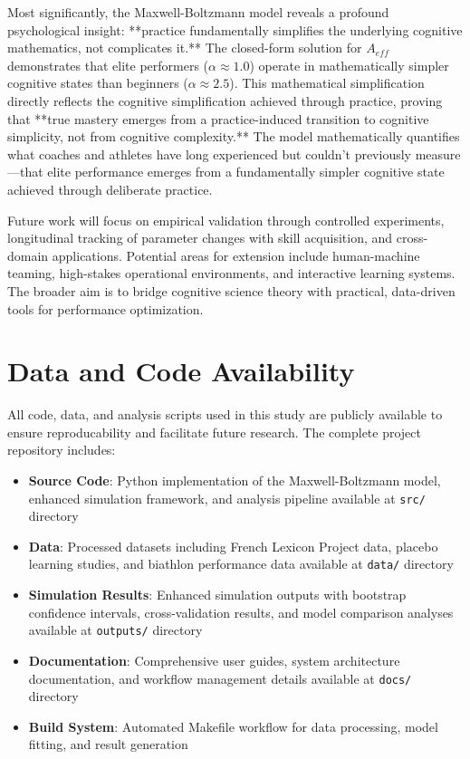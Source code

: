 \documentclass{article}
\begin{document}
Most significantly, the Maxwell-Boltzmann model reveals a profound psychological insight: **practice fundamentally 
simplifies the underlying cognitive mathematics, not complicates it.** The closed-form solution for $A_{eff}$ 
demonstrates that elite performers ($\alpha \approx 1.0$) operate in mathematically simpler cognitive states than beginners 
($\alpha \approx 2.5$). This mathematical simplification directly reflects the cognitive simplification achieved through practice, 
proving that **true mastery emerges from a practice-induced transition to cognitive simplicity, not from cognitive 
complexity.** The model mathematically quantifies what coaches and athletes have long experienced but couldn't 
previously measure—that elite performance emerges from a fundamentally simpler cognitive state achieved through 
deliberate practice.

Future work will focus on empirical validation through controlled experiments, longitudinal tracking of parameter
changes with skill acquisition, and cross-domain applications. Potential areas for extension include human-machine
teaming, high-stakes operational environments, and interactive learning systems. The broader aim is to bridge cognitive
science theory with practical, data-driven tools for performance optimization.

\section*{Data and Code Availability}
All code, data, and analysis scripts used in this study are publicly available to ensure reproducability and 
facilitate future research. The complete project repository includes:

\begin{itemize}
    \item \textbf{Source Code}: Python implementation of the Maxwell-Boltzmann model, enhanced simulation framework, 
    and analysis pipeline available at \texttt{src/} directory
    \item \textbf{Data}: Processed datasets including French Lexicon Project data, placebo learning studies, 
    and biathlon performance data available at \texttt{data/} directory
    \item \textbf{Simulation Results}: Enhanced simulation outputs with bootstrap confidence intervals, 
    cross-validation results, and model comparison analyses available at \texttt{outputs/} directory
    \item \textbf{Documentation}: Comprehensive user guides, system architecture documentation, and 
    workflow management details available at \texttt{docs/} directory
    \item \textbf{Build System}: Automated Makefile workflow for data processing, model fitting, and 
    result generation
\end{itemize}
\end{document}
